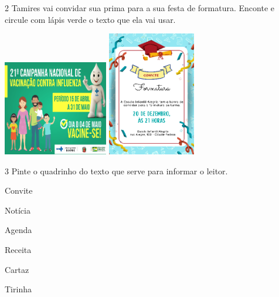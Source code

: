 

\num{2} Tamires vai convidar sua prima para a sua festa de formatura. 
Enconte e circule com lápis verde o texto que ela vai usar. 


\includegraphics[width=1.80556in,height=1.63403in]{media/image100.png}
\includegraphics[width=1.51458in,height=2.14444in]{media/image103.png}


\num{3} Pinte o quadrinho do texto que serve para informar o leitor.


\begin{boxlist}
\boxitem[] Convite

\boxitem[] Notícia

\boxitem[] Agenda 

\boxitem[] Receita

\boxitem[] Cartaz 

\boxitem[] Tirinha
\end{boxlist}

